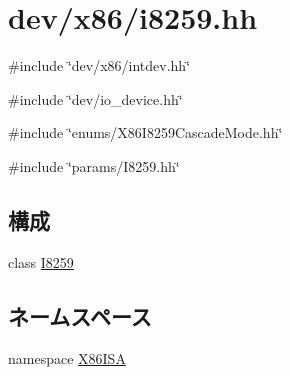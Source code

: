 \hypertarget{i8259_8hh}{
\section{dev/x86/i8259.hh}
\label{i8259_8hh}
}
{\ttfamily \#include \char`\"{}dev/x86/intdev.hh\char`\"{}}\par
{\ttfamily \#include \char`\"{}dev/io\_\-device.hh\char`\"{}}\par
{\ttfamily \#include \char`\"{}enums/X86I8259CascadeMode.hh\char`\"{}}\par
{\ttfamily \#include \char`\"{}params/I8259.hh\char`\"{}}\par
\subsection*{構成}
\begin{DoxyCompactItemize}
\item 
class \hyperlink{classX86ISA_1_1I8259}{I8259}
\end{DoxyCompactItemize}
\subsection*{ネームスペース}
\begin{DoxyCompactItemize}
\item 
namespace \hyperlink{namespaceX86ISA}{X86ISA}
\end{DoxyCompactItemize}
